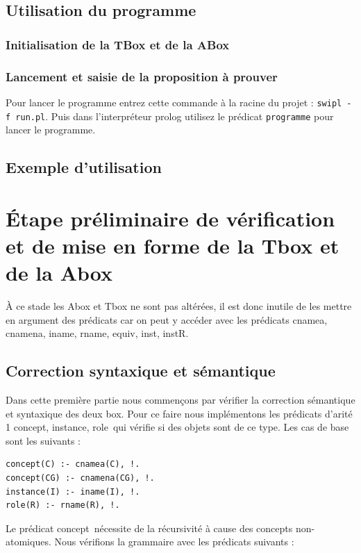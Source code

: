 \documentclass[12pt]{article}
\begin{document}
\subsection{Utilisation du programme}
\subsubsection{Initialisation de la TBox et de la ABox}

\subsubsection{Lancement et saisie de la proposition à prouver}
Pour lancer le programme entrez cette commande à la racine du projet : \verb|swipl -f run.pl|. Puis dans l'interpréteur prolog utilisez le prédicat \verb|programme| pour lancer le programme.


\subsection{Exemple d'utilisation}


\section{\'Etape préliminaire de vérification et de mise en forme de la Tbox et de la Abox}
\`A ce stade les Abox et Tbox ne sont pas altérées, il est donc inutile de les mettre en argument des prédicats car on peut y accéder avec les prédicats \color{blue}cnamea, cnamena, iname, rname, equiv, inst, instR\color{black}.
\subsection{Correction syntaxique et sémantique}
Dans cette première partie nous commençons par vérifier la correction sémantique et syntaxique des deux box. Pour ce faire nous implémentons les prédicats d'arité 1 \color{blue}concept, instance, role\color{black}\ qui vérifie si des objets sont de ce type. Les cas de base sont les suivants :

\begin{verbatim}
concept(C) :- cnamea(C), !.
concept(CG) :- cnamena(CG), !. 
instance(I) :- iname(I), !.
role(R) :- rname(R), !. 
\end{verbatim}

Le prédicat \color{blue}concept\color{black}\ nécessite de la récursivité à cause des concepts non-atomiques. Nous vérifions la grammaire avec les prédicats suivants :
\end{document}
